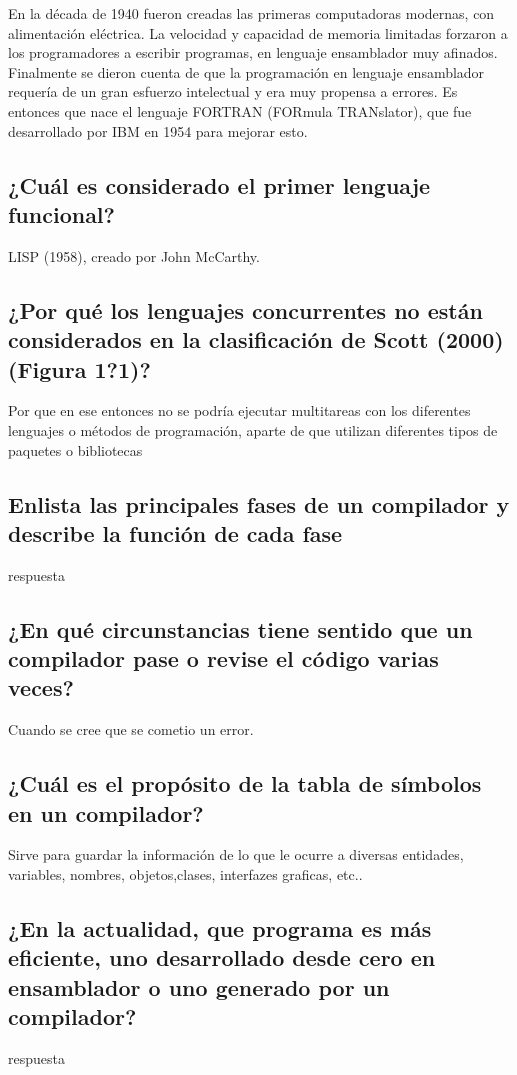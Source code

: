 En la década de 1940 fueron creadas las primeras computadoras modernas, con alimentación eléctrica. La velocidad y capacidad de memoria limitadas forzaron a los programadores a escribir programas, en lenguaje ensamblador muy afinados. Finalmente se dieron cuenta de que la programación en lenguaje ensamblador requería de un gran esfuerzo intelectual y era muy propensa a errores. Es entonces que nace el lenguaje FORTRAN (FORmula TRANslator), que fue desarrollado por IBM en 1954 para mejorar esto.


\subsection{¿Cuál es considerado el primer lenguaje funcional? }

LISP (1958), creado por John McCarthy.

\subsection{¿Por qué los lenguajes concurrentes no están considerados en la clasificación de Scott (2000) (Figura 1?1)?}

Por que en ese entonces no se podría ejecutar multitareas con los diferentes lenguajes o métodos
de programación, aparte de que utilizan diferentes tipos de paquetes o bibliotecas


\subsection{Enlista las principales fases de un compilador y describe la función de cada fase}

respuesta

\subsection{¿En qué circunstancias tiene sentido que un compilador pase o revise el código varias veces?}

Cuando se cree que se cometio un error.

\subsection{¿Cuál es el propósito de la tabla de símbolos en un compilador?}

Sirve para guardar la información de lo que le ocurre a diversas entidades, variables, nombres, objetos,clases, interfazes graficas, etc..

\subsection{¿En la actualidad, que programa es más eficiente, uno desarrollado desde cero en ensamblador o uno generado por un compilador?}

respuesta

